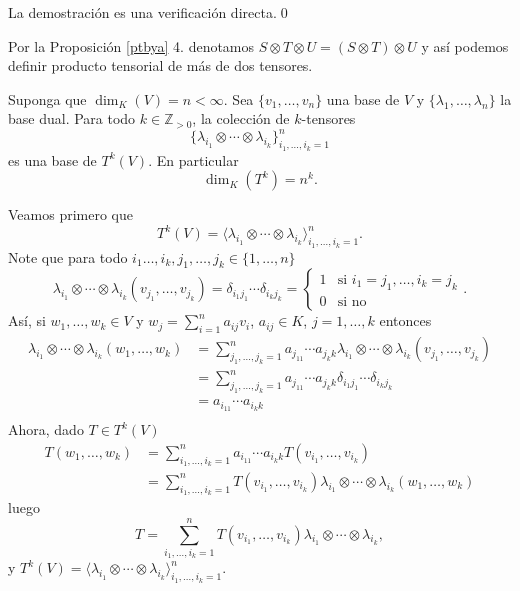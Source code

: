 \dem La demostraci\'on es una verificaci\'on directa.\qed

\begin{nota}
Por la Proposici\'on \ref{ptbya} 4. denotamos $S\otimes T\otimes U= (S\otimes T)\otimes U$ y as\'i podemos definir producto tensorial de m\'as de dos tensores.
\end{nota}

\begin{teo}\label{bt}
Suponga que $\dim_K(V)=n<\infty$. Sea $\{v_1,\ldots,v_n\}$ una base de $V$ y $\{\lambda_1,\ldots,\lambda_n\}$ la base dual. Para todo $k\in\mathbb{Z}_{>0}$, la colecci\'on de $k$-tensores
$$\Big\{\lambda_{i_1}\otimes\cdots\otimes\lambda_{i_k}\Big\}_{i_1,\ldots,i_k=1}^n$$
es una base de $T^k(V)$. En particular $$\dim_K(T^k)=n^k.$$
\end{teo}

\dem Veamos primero que $$T^k(V)=\langle \lambda_{i_1}\otimes\cdots\otimes\lambda_{i_k} \rangle_{i_1,\ldots,i_k=1}^n.$$ Note que para todo $i_1\ldots,i_k,j_1,\ldots,j_k\in\{1,\ldots,n\}$
$$\lambda_{i_1}\otimes\cdots\otimes\lambda_{i_k}(v_{j_1},\ldots,v_{j_k})= \delta_{i_1j_1}\cdots\delta_{i_kj_k}=\left\{\begin{array}{rl}
1 & \text{si } i_1=j_1,\ldots, i_k=j_k \\
0 & \text{si no}
\end{array}\right. .$$
As\'i, si $w_1,\dots,w_k\in V$ y $w_j=\sum_{i=1}^n a_{ij}v_i$, $a_{ij}\in K$, $j=1,\ldots,k$ entonces
\begin{align*}
\lambda_{i_1}\otimes\cdots\otimes\lambda_{i_k}(w_1,\ldots,w_k) &= \sum_{j_1,\ldots,j_k=1}^n a_{j_11}\cdots a_{j_kk} \lambda_{i_1}\otimes\cdots\otimes\lambda_{i_k}(v_{j_1},\ldots,v_{j_k})\\
&= \sum_{j_1,\ldots,j_k=1}^n a_{j_11}\cdots a_{j_kk}\delta_{i_1j_1}\cdots\delta_{i_kj_k}\\
&= a_{i_11}\cdots a_{i_kk}\\
\end{align*}
Ahora, dado $T\in T^k(V)$
\begin{align*}
T(w_1,\ldots,w_k) &= \sum_{i_1,\ldots,i_k=1}^n a_{i_11}\cdots a_{i_kk} T(v_{i_1},\ldots,v_{i_k})\\
&= \sum_{i_1,\ldots,i_k=1}^n T(v_{i_1},\ldots,v_{i_k})\lambda_{i_1}\otimes\cdots\otimes\lambda_{i_k}(w_1,\ldots,w_k)
\end{align*}
luego
$$T=\sum_{i_1,\ldots,i_k=1}^n T(v_{i_1},\ldots,v_{i_k})\lambda_{i_1}\otimes\cdots\otimes\lambda_{i_k},$$
y $T^k(V)=\langle \lambda_{i_1}\otimes\cdots\otimes\lambda_{i_k} \rangle_{i_1,\ldots,i_k=1}^n$.

